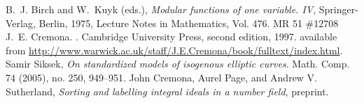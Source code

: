 \documentclass{article}
\theoremstyle{remark}
\begin{document}

\begin{thebibliography}{10}
\providecommand{\MR}{\relax\ifhmode\unskip\space\fi MR }
B.~J. Birch and W.~Kuyk (eds.), \emph{Modular functions of one variable. {IV}},
  Springer-Verlag, Berlin, 1975, Lecture Notes in Mathematics, Vol. 476. \MR{51
  \#12708}
J.~E. Cremona.
.
\newblock Cambridge University Press, second edition, 1997.
\newblock available from
  \url{http://www.warwick.ac.uk/staff/J.E.Cremona/book/fulltext/index.html}.
 Samir Siksek, {\em On standardized models of
  isogenous elliptic curves}. Math. Comp. 74 (2005), no. 250, 949--951.
 John Cremona, Aurel Page, and Andrew
  V. Sutherland, {\em Sorting and labelling integral ideals in a
    number field}, preprint.
\end{thebibliography}
\end{document}
